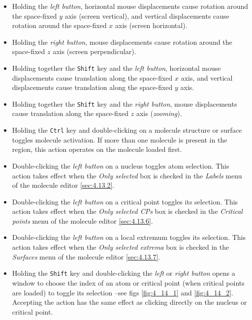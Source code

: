 \documentclass[10pt]{article}
\begin{document}
\begin{itemize}
\item Holding the {\it left button}, horizontal mouse displacements cause
rotation around the space-fixed $y$ axis (screen vertical), and vertical displacements cause rotation
around the space-fixed $x$ axis (screen horizontal).

\item Holding the {\it right button}, mouse displacements cause
rotation around the space-fixed $z$ axis (screen perpendicular).

\item Holding together the \texttt{Shift} key and the {\it left button}, horizontal
mouse displacements cause translation along the space-fixed $x$ axis, and
vertical displacements cause translation along the space-fixed $y$ axis.

\item Holding together the \texttt{Shift} key and the {\it right button}, mouse
displacements cause translation along the space-fixed $z$ axis ({\it zooming}).

\item Holding the \texttt{Ctrl} key and double-clicking on a molecule structure or surface toggles molecule activation. If more than one molecule is present in the region, this action
operates on the molecule loaded first.

\item Double-clicking the {\it left button} on a nucleus toggles atom selection. This action takes effect 
when the {\it Only selected} box is checked in the {\it Labels} menu of the molecule editor \ref{sec:4.13.2}.

\item Double-clicking the {\it left button} on a critical 
point
toggles its selection. This action takes effect 
when the {\it Only selected CPs} box is checked in the {\it Critical points} menu of the molecule editor \ref{sec:4.13.6}.

\item Double-clicking the {\it left button} on a local extremum toggles its selection. This action takes effect 
when the {\it Only selected extrema} box is checked in the {\it Surfaces} menu of the molecule editor \ref{sec:4.13.7}.

\item Holding the \texttt{Shift} key and double-clicking the {\it left} or 
{\it right button}
opens a window to choose the index of an atom or critical point (when critical points are loaded) 
to toggle its selection --see figs \ref{fig:4_14_1} and \ref{fig:4_14_2}.
Accepting the action has the same effect as clicking directly on the nucleus or critical point.
\end{itemize}
\end{document}
